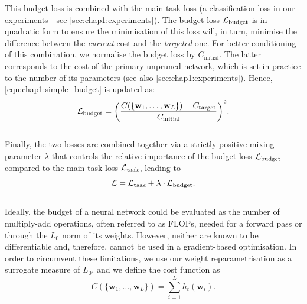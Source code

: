 \noindent This budget loss is combined with the main task loss (a classification
loss in our experiments - see \cref{sec:chap1:experiments}). The budget loss $
{\cal L}_\text{budget}$ is in quadratic form to ensure the minimisation of this
loss will, in turn, minimise the difference between the {\em current} cost and
the {\em targeted} one. For better conditioning of this combination, we
normalise the budget loss by $C_\text{initial}$. The latter corresponds to the
cost of the primary unpruned network, which is set in practice to the number of
its parameters (see also \cref{sec:chap1:experiments}). Hence,
\cref{eqn:chap1:simple_budget} is updated as:\\

\begin{equation}
  \label{eqn:chap1:real_budget}
  {\cal L}_\text{budget} = \biggl( \displaystyle\frac{C(\{\mathbf{w}_1,\dots, \mathbf{w}_L\}) - C_\text{target}}{C_\text{initial}} \biggr)^2.
\end{equation}\\

Finally, the two losses are combined together via a strictly positive mixing
parameter $\lambda$ that  controls the relative importance of  the budget loss
${\cal L}_\text{budget}$ compared to the main task loss ${\cal L}_\text{task}$,
leading to\\

\begin{equation}
  \label{eqn:chap1:globalloss}
   {\cal L} =  {\cal L}_\text{task} + \lambda \cdot {\cal L}_\text{budget}.
\end{equation} \\

Ideally, the budget of a neural network could be evaluated as the number of
multiply-add operations, often referred to as \acp{FLOP}, needed for a forward
pass or through the $L_0$ norm of its weights. However, neither are known to
be differentiable and, therefore, cannot be used in a gradient-based
optimisation. In order to circumvent these limitations, we use our weight
reparametrisation as a surrogate measure of $L_0$, and we define the cost
function as \\

\begin{equation}
  \label{eqn:chap1:cost_function}
  C(\{\mathbf{w}_1,\dots, \mathbf{w}_L\}) = \displaystyle \sum_{i=1}^{L} h_t(\mathbf{w}_i). 
\end{equation} \\


